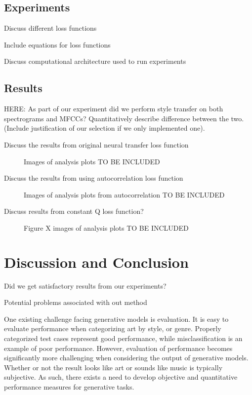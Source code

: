 \documentclass{article}
\begin{document}
\subsection{Experiments}

Discuss different loss functions

Include equations for loss functions

Discuss computational architecture used to run experiments

\subsection{Results}

HERE: As part of our experiment did we perform style transfer on both spectrograms and MFCCs? Quantitatively describe difference between the two. (Include justification of our selection if we only implemented one).

Discuss the results from original neural transfer loss function

\begin{figure}[h]
  \centering
  \fbox{\rule[-.5cm]{0cm}{4cm} \rule[-.5cm]{4cm}{0cm}}
  \caption{Images of analysis plots TO BE INCLUDED}
\end{figure}

Discuss the results from using autocorrelation loss function

\begin{figure}[h]
  \centering
  \fbox{\rule[-.5cm]{0cm}{4cm} \rule[-.5cm]{4cm}{0cm}}
  \caption{Images of analysis plots from autocorrelation TO BE INCLUDED}
\end{figure}

Discuss results from constant Q loss function?

\begin{figure}[h]
  \centering
  \fbox{\rule[-.5cm]{0cm}{4cm} \rule[-.5cm]{4cm}{0cm}}
  \caption{Figure X images of analysis plots TO BE INCLUDED}
\end{figure}

\section{Discussion and Conclusion}

Did we get satisfactory results from our experiments?

Potential problems associated with out method

One existing challenge facing generative models is evaluation. It is easy to evaluate performance when categorizing art by style, or genre. Properly categorized test cases represent good performance, while misclassification is an example of poor performance. However, evaluation of performance becomes significantly more challenging when considering the output of generative models. Whether or not the result looks like art or sounds like music is typically subjective. As such, there exists a need to develop objective and quantitative performance measures for generative tasks.


\end{document}
